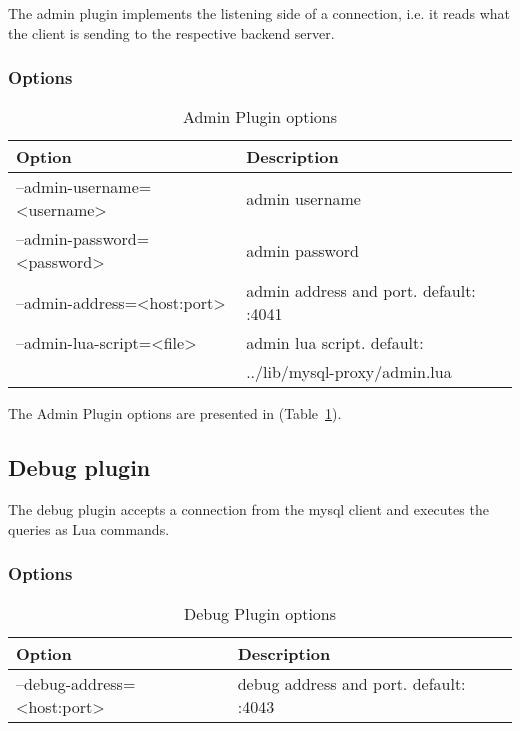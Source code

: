 The admin plugin implements the listening side of a connection, i.e. it reads what the client is sending to the respective backend server.

\subsubsection{Options}

\begin{table}[h!]
\centering
    \begin{tabular}{ | l | l |}
    \hline
    Option & Description \\ \hline
    --admin-username=<username> & admin username \\ \hline
	--admin-password=<password>  & admin password \\ \hline
	--admin-address=<host:port> & admin address and port. default: :4041 \\ \hline
	--admin-lua-script=<file> & admin lua script. default:\\ 
	&   ../lib/mysql-proxy/admin.lua \\ \hline
    \end{tabular}

\caption{Admin Plugin options}
\label{tab:admin_plugin_options}
\end{table}

The Admin Plugin options are presented in (Table~\ref{tab:admin_plugin_options}).


\subsection{Debug plugin}


The debug plugin accepts a connection from the mysql client and executes the queries as Lua commands.

\subsubsection{Options}

\begin{table}[h!]
\centering
    \begin{tabular}{ | l | l |}
    \hline
    Option & Description \\ \hline
    --debug-address=<host:port> & debug address and port. default: :4043 \\ \hline
    \end{tabular}

\caption{Debug Plugin options}
\label{tab:debug_plugin_options}
\end{table}

